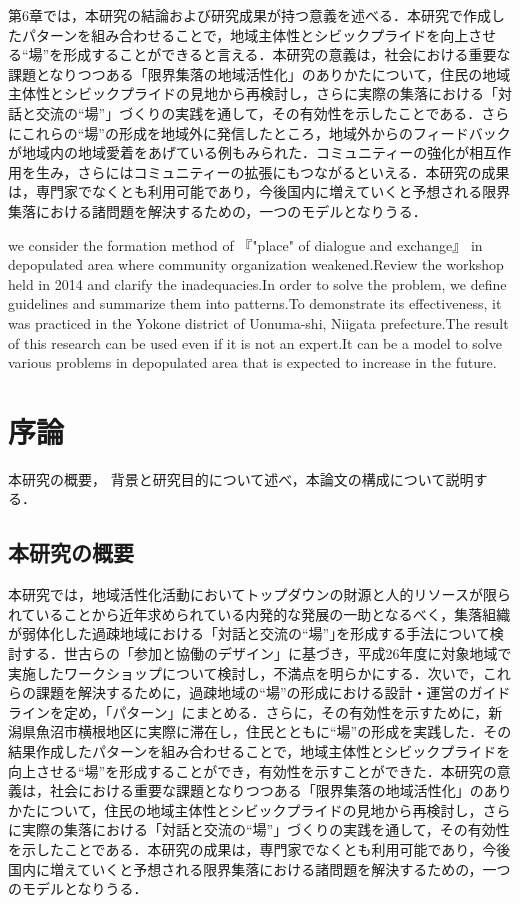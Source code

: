 \documentclass[a4paper]{jsarticle}
\begin{document}
 第6章では，本研究の結論および研究成果が持つ意義を述べる．本研究で作成したパターンを組み合わせることで，地域主体性とシビックプライドを向上させる“場”を形成することができると言える．本研究の意義は，社会における重要な課題となりつつある「限界集落の地域活性化」のありかたについて，住民の地域主体性とシビックプライドの見地から再検討し，さらに実際の集落における「対話と交流の“場”」づくりの実践を通して，その有効性を示したことである．さらにこれらの“場”の形成を地域外に発信したところ，地域外からのフィードバックが地域内の地域愛着をあげている例もみられた．コミュニティーの強化が相互作用を生み，さらにはコミュニティーの拡張にもつながるといえる．本研究の成果は，専門家でなくとも利用可能であり，今後国内に増えていくと予想される限界集落における諸問題を解決するための，一つのモデルとなりうる．





we consider the formation method of 『"place" of dialogue and exchange』 in depopulated area where community organization weakened.Review the workshop held in 2014 and clarify the inadequacies.In order to solve the problem, we define guidelines and summarize them into patterns.To demonstrate its effectiveness, it was practiced in the Yokone district of Uonuma-shi, Niigata prefecture.The result of this research can be used even if it is not an expert.It can be a model to solve various problems in depopulated area that is expected to increase in the future.
\makemokuji


\newpage

\setcounter{page}{1} %
\section{序論}
本研究の概要， 背景と研究目的について述べ，本論文の構成について説明する．
\subsection{本研究の概要}
本研究では，地域活性化活動においてトップダウンの財源と人的リソースが限られていることから近年求められている内発的な発展の一助となるべく，集落組織が弱体化した過疎地域における「対話と交流の“場”｣を形成する手法について検討する．世古らの「参加と協働のデザイン」に基づき，平成26年度に対象地域で実施したワークショップについて検討し，不満点を明らかにする．次いで，これらの課題を解決するために，過疎地域の“場”の形成における設計・運営のガイドラインを定め，「パターン」にまとめる．さらに，その有効性を示すために，新潟県魚沼市横根地区に実際に滞在し，住民とともに“場”の形成を実践した．その結果作成したパターンを組み合わせることで，地域主体性とシビックプライドを向上させる“場”を形成することができ，有効性を示すことができた．本研究の意義は，社会における重要な課題となりつつある「限界集落の地域活性化」のありかたについて，住民の地域主体性とシビックプライドの見地から再検討し，さらに実際の集落における「対話と交流の“場”」づくりの実践を通して，その有効性を示したことである．本研究の成果は，専門家でなくとも利用可能であり，今後国内に増えていくと予想される限界集落における諸問題を解決するための，一つのモデルとなりうる．
\end{document}
